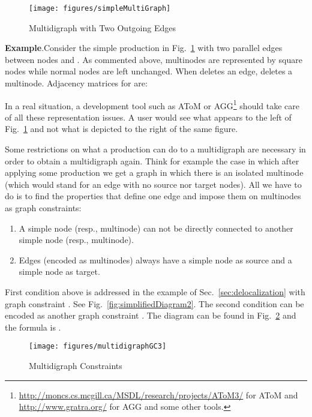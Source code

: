 \documentclass{fundam}
\newcommand{\proofend}{\hfill}
\begin{document}
\begin{figure}[htbp]
  \centering
  \texttt{[image: figures/simpleMultiGraph]}
  \caption{Multidigraph with Two Outgoing Edges}
  \label{fig:simpleMultiGraph}
\end{figure}

\noindent\textbf{Example}.Consider the simple production in
Fig.~\ref{fig:simpleMultiGraph} with two parallel edges between nodes
 and .  As commented above, multinodes are represented by square
nodes while normal nodes are left unchanged.  When  deletes an
edge,  deletes a multinode.  Adjacency matrices for 
are:





In a real situation, a development tool such as AToM or
AGG\footnote{\url{http://moncs.cs.mcgill.ca/MSDL/research/projects/AToM3/}
  for AToM and \url{http://www.gratra.org/} for AGG and some other
  tools.} should take care of all these representation issues.  A user
would see what appears to the left of Fig.~\ref{fig:simpleMultiGraph}
and not what is depicted to the right of the same figure. \proofend

Some restrictions on what a production can do to a multidigraph are
necessary in order to obtain a multidigraph again. Think for example
the case in which after applying some production we get a graph in
which there is an isolated multinode (which would stand for an edge
with no source nor target nodes). All we have to do is to find the
properties that define one edge and impose them on multinodes as graph
constraints:
\begin{enumerate}
\item A simple node (resp., multinode) can not be directly connected
  to another simple node (resp., multinode).
\item Edges (encoded as multinodes) always have a simple node as
  source and a simple node as target.
\end{enumerate}

First condition above is addressed in the example of
Sec.~\ref{sec:delocalization} with graph constraint . See
Fig.~\ref{fig:simplifiedDiagram2}. The second condition can be encoded
as another graph constraint . The diagram can be found in
Fig.~\ref{fig:multidigraphGC2} and the formula is .

\begin{figure}[htbp]
  \centering
  \texttt{[image: figures/multidigraphGC3]}
  \caption{Multidigraph Constraints}
  \label{fig:multidigraphGC2}
\end{figure}
\end{document}
